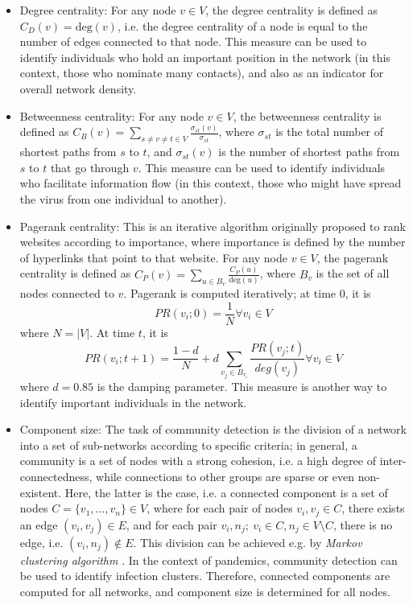 \begin{itemize}
	\item Degree centrality: For any node $v \in V$, the degree centrality is defined as $C_D(v) = \text{deg}(v)$, i.e. the degree centrality of a node is equal to the number of edges connected to that node. This measure can be used to identify individuals who hold an important position in the network (in this context, those who nominate many contacts), and also as an indicator for overall network density.
	\item Betweenness centrality: For any node $v \in V$, the betweenness centrality is defined as $C_B(v) = \sum_{s\neq v\neq t\in V}\frac{\sigma_{st}(v)}{\sigma_{st}}$, where $\sigma_{st}$ is the total number of shortest paths from $s$ to $t$, and $\sigma_{st}(v)$ is the number of shortest paths from $s$ to $t$ that go through $v$. This measure can be used to identify individuals who facilitate information flow (in this context, those who might have spread the virus from one individual to another).
	\item Pagerank centrality: This is an iterative algorithm originally proposed to rank websites according to importance, where importance is defined by the number of hyperlinks that point to that website. For any node $v \in V$, the pagerank centrality is defined as $C_P(v) = \sum_{u \in B_v}\frac{C_P(u)}{\text{deg}(u)}$, where $B_v$ is the set of all nodes connected to $v$. Pagerank is computed iteratively; at time 0, it is
	\begin{equation*}
		PR(v_i;0) = \frac{1}{N} \forall v_i \in V
	\end{equation*}
	where $N = \lvert V \rvert$. At time $t$, it is
	\begin{equation*}
		PR(v_i;t+1) = \frac{1 - d}{N} + d \sum_{v_j \in B_{v_i}} \frac{PR(v_j;t)}{deg(v_j)} \forall v_i \in V
	\end{equation*}
	where $d = 0.85$ is the damping parameter. This measure is another way to identify important individuals in the network.
	\item Component size: The task of community detection is the division of a network into a set of sub-networks according to specific criteria; in general, a community is a set of nodes with a strong cohesion, i.e. a high degree of inter-connectedness, while connections to other groups are sparse or even non-existent. Here, the latter is the case, i.e. a connected component is a set of nodes $C = \{v_1,...,v_n\} \in V$, where for each pair of nodes $v_i,v_j \in C$, there exists an edge $(v_i,v_j) \in E$, and for each pair $v_i,n_j;\: v_i \in C, n_j \in V \setminus C$, there is no edge, i.e. $(v_i,n_j) \notin E$. This division can be achieved e.g. by \emph{Markov clustering algorithm} \cite{community_detection,markov_clustering}. In the context of pandemics, community detection can be used to identify infection clusters. Therefore, connected components are computed for all networks, and component size is determined for all nodes.

\end{itemize}
